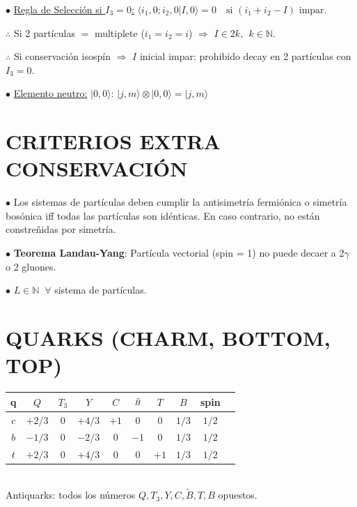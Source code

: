 $\bullet$ \underline{Regla de Selección si $I_3 = 0$:}
$\langle i_1, 0; i_2, 0 | I, 0 \rangle = 0 \quad \text{si } (i_1 + i_2 - I) \text{  impar.}$

$\therefore$ Si 2 partículas $=$ multiplete ($i_1 = i_2 = i$) $\Rightarrow$ $I \in 2 k, \,\; k \in \mathbb{N}$.

$\therefore$ Si conservación isospín $\Rightarrow$ $I$ inicial impar: prohibido decay en 2 partículas con $I_3 = 0$.

$\bullet$ \underline{Elemento neutro:}  $|0, 0\rangle$: $|j, m\rangle \otimes |0, 0\rangle = |j, m\rangle$ 


\section{CRITERIOS EXTRA CONSERVACIÓN}
$\bullet$ Los sistemas de partículas deben cumplir la antisimetría fermiónica o simetría bosónica iff todas las partículas son idénticas. En caso contrario, no están constreñidas por simetría.

$\bullet$ \textbf{Teorema Landau-Yang}: Partícula vectorial (spin = 1) no puede decaer a 2$\gamma$ o 2 gluones.

$\bullet$ $L \in \mathbb{N} \;\; \forall$ sistema de partículas. 







\hypertarget{quarks_table}{\section{QUARKS (CHARM, BOTTOM, TOP)}}
\begin{center}
\begin{tabular}{|c|c|c|c|c|c|c|c|c|c|}
\hline
\textbf{q} & \textbf{$Q$} & \textbf{$T_3$} & \textbf{$Y$}  & \textbf{$C$} & \textbf{$\scalebox{0.80}{${\tilde{B}}$}$} & \textbf{$T$} & \textbf{$B$} & \textbf{spin}\\ \hline
$c$ & $+2/3$ & $0$ & $+4/3$  & $+1$ & $0$ & $0$ & $1/3$ & $1/2$ \\ \hline
$b$ & $-1/3$ & $0$ & $-2/3$  & $0$ & $-1$ & $0$ & $1/3$ & $1/2$ \\ \hline
$t$ & $+2/3$ & $0$ & $+4/3$  & $0$ & $0$ & $+1$ & $1/3$ & $1/2$ \\ \hline
\end{tabular}\\[2pt]
Antiquarks: todos los números $Q, T_3, Y,  C, \tilde{B}, T, B$ opuestos.
\end{center}


